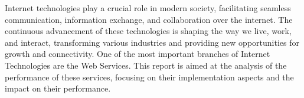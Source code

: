 Internet technologies play a crucial role in modern society, facilitating seamless communication, information exchange, and collaboration 
over the internet. The continuous advancement of these technologies is shaping the way we live, work, and interact, transforming various
industries and providing new opportunities for growth and connectivity. One of the most important branches of Internet Technologies 
are the Web Services. This report is aimed at the analysis of the performance of these services,
focusing on their implementation aspects and the impact on their performance.